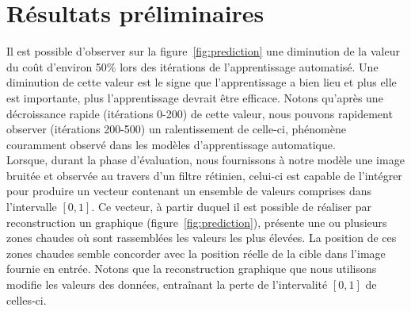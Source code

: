\section{Résultats préliminaires}

Il est possible d'observer sur la figure~\ref{fig:prediction} une diminution de la valeur du coût d'environ 50\% lors des itérations de l'apprentissage automatisé. 
Une diminution de cette valeur est le signe que l'apprentissage a bien lieu et plus elle est importante, plus l'apprentissage devrait être efficace.
Notons qu'après une décroissance rapide (itérations 0-200) de cette valeur, nous pouvons rapidement observer (itérations 200-500) un ralentissement de celle-ci, phénomène couramment observé dans les modèles d'apprentissage automatique. \\
Lorsque, durant la phase d'évaluation, nous fournissons à notre modèle une image bruitée et observée au travers d'un filtre rétinien, celui-ci est capable de l'intégrer pour produire un vecteur contenant un ensemble de valeurs comprises dans l'intervalle $[0,1]$.
Ce vecteur, à partir duquel il est possible de réaliser par reconstruction un graphique (figure~\ref{fig:prediction}), présente une ou plusieurs zones chaudes où sont rassemblées les valeurs les plus élevées. 
La position de ces zones chaudes semble concorder avec la position réelle de la cible dans l'image fournie en entrée.
Notons que la reconstruction graphique que nous utilisons modifie les valeurs des données, entraînant la perte de l'intervalité $[0,1]$ de celles-ci. \\